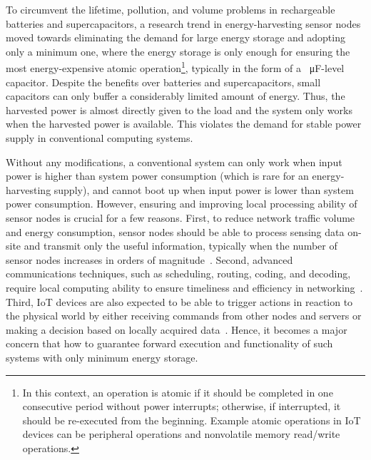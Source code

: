 To circumvent the lifetime, pollution, and volume problems in rechargeable batteries and supercapacitors, a research trend in energy-harvesting sensor nodes moved towards eliminating the demand for large energy storage and adopting only a minimum one, where the energy storage is only enough for ensuring the most energy-expensive atomic operation\footnote{In this context, an operation is atomic if it should be completed in one consecutive period without power interrupts; otherwise, if interrupted, it should be re-executed from the beginning. Example atomic operations in IoT devices can be peripheral operations and nonvolatile memory read/write operations.}, typically in the form of a \SI{}{\micro\farad}-level capacitor. 
Despite the benefits over batteries and supercapacitors, small capacitors can only buffer a considerably limited amount of energy. 
Thus, the harvested power is almost directly given to the load and the system only works when the harvested power is available. 
This violates the demand for stable power supply in conventional computing systems.

Without any modifications, a conventional system can only work when input power is higher than system power consumption (which is rare for an energy-harvesting supply), and cannot boot up when input power is lower than system power consumption. 
However, ensuring and improving local processing ability of sensor nodes is crucial for a few reasons. 
First, to reduce network traffic volume and energy consumption, sensor nodes should be able to process sensing data on-site and transmit only the useful information, typically when the number of sensor nodes increases in orders of magnitude~\cite{shi2016edge}. 
Second, advanced communications techniques, such as scheduling, routing, coding, and decoding, require local computing ability to ensure timeliness and efficiency in networking~\cite{akyildiz2002wireless}. 
Third, IoT devices are also expected to be able to trigger actions in reaction to the physical world by either receiving commands from other nodes and servers or making a decision based on locally acquired data~\cite{miorandi2012internet}. 
Hence, it becomes a major concern that how to guarantee forward execution and functionality of such systems with only minimum energy storage.

